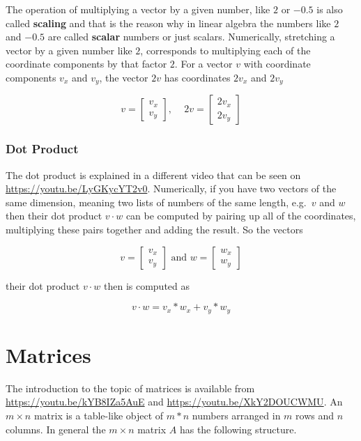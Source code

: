 \documentclass[
]{book}
\theoremstyle{definition}
\theoremstyle{definition}
\theoremstyle{definition}
\theoremstyle{remark}
\begin{document}
The operation of multiplying a vector by a given number, like \(2\) or \(-0.5\) is also called \textbf{scaling} and that is the reason why in linear algebra the numbers like \(2\) and \(-0.5\) are called \textbf{scalar} numbers or just scalars. Numerically, stretching a vector by a given number like \(2\), corresponds to multiplying each of the coordinate components by that factor \(2\). For a vector \(v\) with coordinate components \(v_x\) and \(v_y\), the vector \(2v\) has coordinates \(2v_x\) and \(2v_y\)

\[v = \left[\begin{array}{c} v_x \\ v_y \end{array}\right] \text{, }\quad 2v = \left[\begin{array}{c} 2v_x \\ 2v_y \end{array}\right]\]

\hypertarget{intro-linalg-dot-product}{%
\subsubsection{Dot Product}\label{intro-linalg-dot-product}}

The dot product is explained in a different video that can be seen on \url{https://youtu.be/LyGKycYT2v0}. Numerically, if you have two vectors of the same dimension, meaning two lists of numbers of the same length, e.g.~\(v\) and \(w\) then their dot product \(v \cdot w\) can be computed by pairing up all of the coordinates, multiplying these pairs together and adding the result. So the vectors

\[v = \left[\begin{array}{c} v_x \\ v_y \end{array}\right] \text{ and } w= \left[\begin{array}{c} w_x \\ w_y \end{array}\right]\]

their dot product \(v \cdot w\) then is computed as

\[v \cdot w = v_x * w_x + v_y * w_y\]

\hypertarget{intro-linalg-matrices}{%
\section{Matrices}\label{intro-linalg-matrices}}

The introduction to the topic of matrices is available from \url{https://youtu.be/kYB8IZa5AuE} and \url{https://youtu.be/XkY2DOUCWMU}. An \(m \times n\) matrix is a table-like object of \(m*n\) numbers arranged in \(m\) rows and \(n\) columns. In general the \(m \times n\) matrix \(A\) has the following structure.
\end{document}
